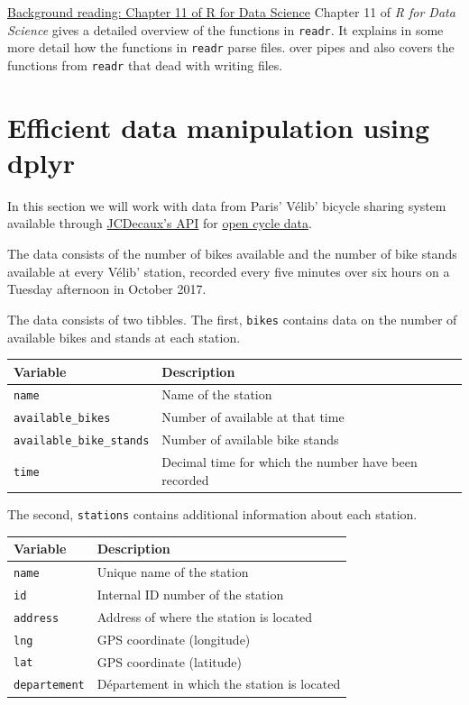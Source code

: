 \documentclass[
]{book}
\begin{document}
\href{\%22http://r4ds.had.co.nz/data-import.html\%22}{Background reading: Chapter 11 of R for Data Science}
Chapter 11 of \emph{R for Data Science} gives a detailed overview of the functions in \texttt{readr}. It explains in some more detail how the functions in \texttt{readr} parse files. over pipes and also covers the functions from \texttt{readr} that dead with writing files.

\hypertarget{efficient-data-manipulation-using-dplyr}{%
\section{Efficient data manipulation using dplyr}\label{efficient-data-manipulation-using-dplyr}}

In this section we will work with data from Paris' Vélib' bicycle sharing system available through \href{https://developer.jcdecaux.com/}{JCDecaux's API} for \href{https://developer.jcdecaux.com/\#/opendata/}{open cycle data}.

The data consists of the number of bikes available and the number of bike stands available at every Vélib' station, recorded every five minutes over six hours on a Tuesday afternoon in October 2017.

The data consists of two tibbles. The first, \texttt{bikes} contains data on the number of available bikes and stands at each station.

\begin{longtable}[]{@{}ll@{}}
\toprule()
Variable & Description \\
\midrule()
\endhead
\texttt{name} & Name of the station \\
\texttt{available\_bikes} & Number of available at that time \\
\texttt{available\_bike\_stands} & Number of available bike stands \\
\texttt{time} & Decimal time for which the number have been recorded \\
\bottomrule()
\end{longtable}

The second, \texttt{stations} contains additional information about each station.

\begin{longtable}[]{@{}ll@{}}
\toprule()
Variable & Description \\
\midrule()
\endhead
\texttt{name} & Unique name of the station \\
\texttt{id} & Internal ID number of the station \\
\texttt{address} & Address of where the station is located \\
\texttt{lng} & GPS coordinate (longitude) \\
\texttt{lat} & GPS coordinate (latitude) \\
\texttt{departement} & Département in which the station is located \\
\bottomrule()
\end{longtable}
\end{document}
